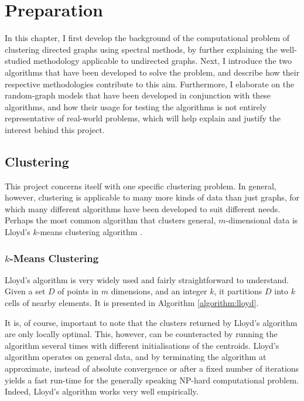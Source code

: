 \chapter{Preparation}

In this chapter, I first develop the background of the computational problem of clustering 
directed graphs using spectral methods, by further explaining the well-studied methodology 
applicable to undirected graphs. Next, I introduce the two algorithms that have been developed to 
solve the problem, and describe how their respective methodologies contribute to this aim. 
Furthermore, I elaborate on the random-graph models that have been developed in conjunction with 
these algorithms, and how their usage for testing the algorithms is not entirely representative of 
real-world problems, which will help explain and justify the interest behind this project. 

\section{Clustering}

This project concerns itself with one specific clustering problem. In general, however, clustering
is applicable to many more kinds of data than just graphs, for which many different algorithms have 
been developed to suit different needs. Perhaps the most common algorithm that clusters general, 
$m$-dimensional data is Lloyd's $k$-means clustering algorithm \cite{lloyd}.

\subsection{$k$-Means Clustering}
Lloyd's  algorithm is very widely used and fairly straightforward to 
understand. Given a set $D$ of points in $m$ dimensions, and an integer $k$, it partitions $D$ 
into $k$ cells of nearby elements. It is presented in Algorithm \ref{algorithm:lloyd}.

It is, of course, important to note that the clusters returned by Lloyd's algorithm are only 
locally optimal. This, however, can be counteracted by running the algorithm several times with 
different initialisations of the centroids. Lloyd's algorithm operates on general data, and by 
terminating the algorithm at approximate, instead of absolute convergence or after a fixed number 
of iterations yields a fast run-time for the generally speaking NP-hard computational 
problem. Indeed, Lloyd's algorithm works very well empirically.

